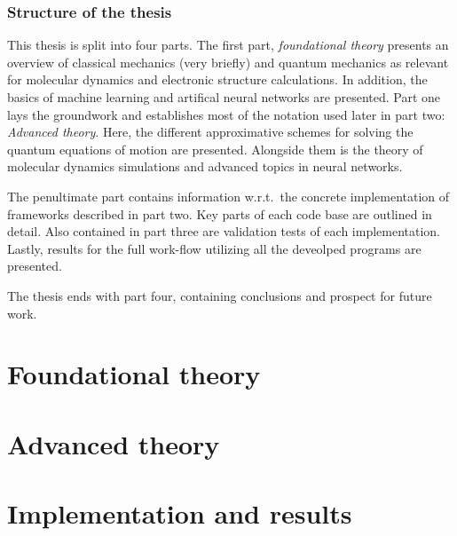 \documentclass[twoside,english]{uiofysmaster}
\begin{document}
\section{Structure of the thesis}
This thesis is split into four parts. The first part, \emph{foundational theory} presents an overview of classical mechanics (very briefly) and quantum mechanics as relevant for molecular dynamics and electronic structure calculations. In addition, the basics of machine learning and artifical neural networks are presented. Part one lays the groundwork and establishes most of the notation used later in part two: \emph{Advanced theory}. Here, the different approximative schemes for solving the quantum equations of motion are presented. Alongside them is the theory of molecular dynamics simulations and advanced topics in neural networks.

The penultimate part contains information w.r.t.\ the concrete implementation of frameworks described in part two. Key parts of each code base are outlined in detail. Also contained in part three are validation tests of each implementation. Lastly, results for the full work-flow utilizing all the deveolped programs are presented.

The thesis ends with part four, containing conclusions and prospect for future work.

\nocite{ISO80000}
\nocite{stende}
\nocite{treider}
\nocite{dragly}

\part{Foundational theory}




\part{Advanced theory}





\part{Implementation and results}






\end{document}
